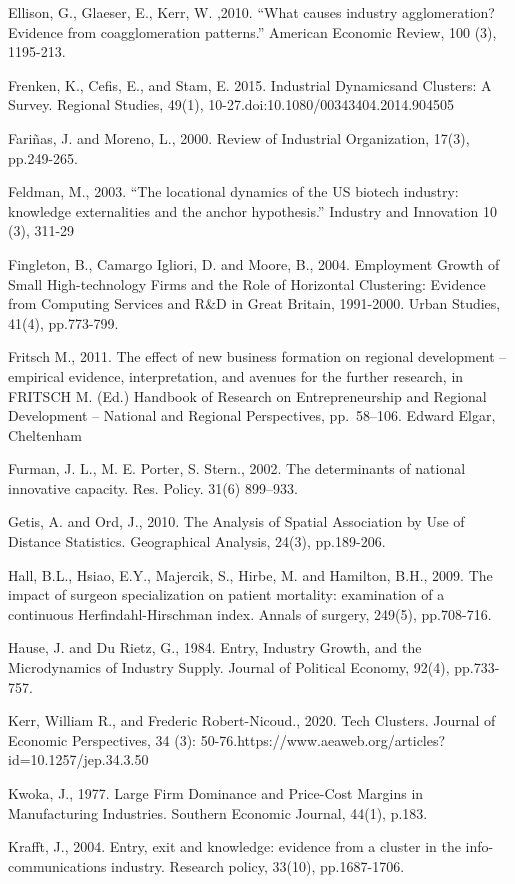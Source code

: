 \documentclass[
  12pt,
  oneside]{book}
\begin{document}
Ellison, G., Glaeser, E., Kerr, W. ,2010. ``What causes industry agglomeration? Evidence from
coagglomeration patterns.'' American Economic Review, 100 (3), 1195-213.

Frenken, K., Cefis, E., and Stam, E. 2015. Industrial Dynamicsand Clusters: A Survey. Regional Studies, 49(1), 10-27.doi:10.1080/00343404.2014.904505

Fariñas, J. and Moreno, L., 2000. Review of Industrial Organization, 17(3), pp.249-265.

Feldman, M., 2003. ``The locational dynamics of the US biotech industry: knowledge externalities
and the anchor hypothesis.'' Industry and Innovation 10 (3), 311-29

Fingleton, B., Camargo Igliori, D. and Moore, B., 2004. Employment Growth of Small High-technology Firms and the Role of Horizontal Clustering: Evidence from Computing Services and R\&D in Great Britain, 1991-2000. Urban Studies, 41(4), pp.773-799.

Fritsch M., 2011. The effect of new business formation on regional development -- empirical evidence, interpretation, and avenues for the further research, in FRITSCH M. (Ed.) Handbook of Research on Entrepreneurship and Regional Development -- National and Regional Perspectives, pp.~58--106. Edward Elgar, Cheltenham

Furman, J. L., M. E. Porter, S. Stern., 2002. The determinants of national innovative capacity. Res. Policy. 31(6) 899--933.

Getis, A. and Ord, J., 2010. The Analysis of Spatial Association by Use of Distance Statistics. Geographical Analysis, 24(3), pp.189-206.

Hall, B.L., Hsiao, E.Y., Majercik, S., Hirbe, M. and Hamilton, B.H., 2009. The impact of surgeon specialization on patient mortality: examination of a continuous Herfindahl-Hirschman index. Annals of surgery, 249(5), pp.708-716.

Hause, J. and Du Rietz, G., 1984. Entry, Industry Growth, and the Microdynamics of Industry Supply. Journal of Political Economy, 92(4), pp.733-757.

Kerr, William R., and Frederic Robert-Nicoud., 2020. Tech Clusters. Journal of Economic Perspectives, 34 (3): 50-76.https://www.aeaweb.org/articles?id=10.1257/jep.34.3.50

Kwoka, J., 1977. Large Firm Dominance and Price-Cost Margins in Manufacturing Industries. Southern Economic Journal, 44(1), p.183.

Krafft, J., 2004. Entry, exit and knowledge: evidence from a cluster in the info-communications industry. Research policy, 33(10), pp.1687-1706.
\end{document}
